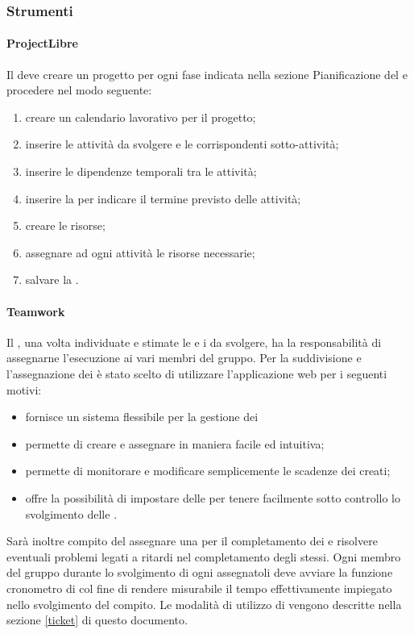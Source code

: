 \documentclass[12pt,a4paper]{article}
\begin{document}
\subsubsection{Strumenti}

\paragraph{ProjectLibre} \label{projeclibre}
Il \PM{} deve creare un progetto per ogni fase indicata nella sezione Pianificazione del \PdP{} e procedere nel modo seguente:
\begin{enumerate}
	\item creare un calendario lavorativo per il progetto;
	\item inserire le attività da svolgere e le corrispondenti sotto-attività;
	\item inserire le dipendenze temporali tra le attività;
	\item inserire la  per indicare il termine previsto delle attività;
	\item creare le risorse;
	\item assegnare ad ogni attività le risorse necessarie;
	\item salvare la .
\end{enumerate}

\paragraph{Teamwork}\label{swGestioneProgetto}
Il \PM{}, una volta individuate e stimate le  e i  da svolgere, ha la responsabilità di assegnarne l'esecuzione ai vari membri del gruppo. Per la suddivisione e l'assegnazione dei  è stato scelto di utilizzare l'applicazione web  per i seguenti motivi: 
\begin{itemize}
	\item fornisce un sistema flessibile per la gestione dei 
	\item permette di creare e assegnare  in maniera facile ed intuitiva; 
	\item permette di monitorare e modificare semplicemente le scadenze dei  creati;
	\item offre la possibilità di impostare delle  per tenere facilmente sotto controllo lo svolgimento delle .
\end{itemize}
Sarà inoltre compito del \PM{} assegnare una  per il completamento dei  e risolvere eventuali problemi legati a ritardi nel completamento degli stessi.
Ogni membro del gruppo durante lo svolgimento di ogni  assegnatoli deve avviare la funzione cronometro di  col fine di rendere misurabile il tempo effettivamente impiegato nello svolgimento del compito.
Le modalità di utilizzo di  vengono descritte nella sezione \ref{ticket} di questo documento.
\end{document}
